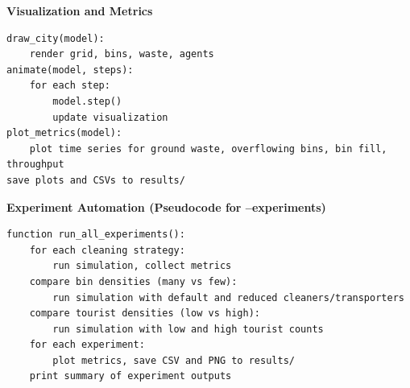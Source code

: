 \documentclass[12pt,a4paper]{article}
\begin{document}
\textbf{Visualization and Metrics}
\begin{verbatim}
draw_city(model):
    render grid, bins, waste, agents
animate(model, steps):
    for each step:
        model.step()
        update visualization
plot_metrics(model):
    plot time series for ground waste, overflowing bins, bin fill, throughput
save plots and CSVs to results/
\end{verbatim}

\textbf{Experiment Automation (Pseudocode for --experiments)}
\begin{verbatim}
function run_all_experiments():
    for each cleaning strategy:
        run simulation, collect metrics
    compare bin densities (many vs few):
        run simulation with default and reduced cleaners/transporters
    compare tourist densities (low vs high):
        run simulation with low and high tourist counts
    for each experiment:
        plot metrics, save CSV and PNG to results/
    print summary of experiment outputs
\end{verbatim}
\end{document}
